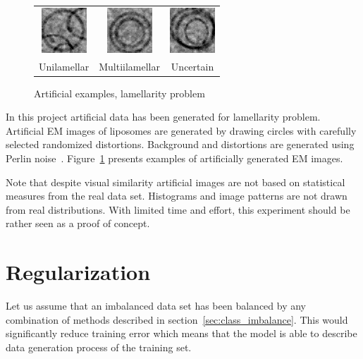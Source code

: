 \documentclass[a4paper, 11pt, table]{article}
\begin{document}
\begin{figure}[H]
\centering
\begin{tabular}{ccc}
	\includegraphics[scale=1.5]{synthetic/uni.png} & \includegraphics[scale=1.5]{synthetic/multi.png} & \includegraphics[scale=1.5]{synthetic/uncertain.png} \\
	Unilamellar & Multiilamellar & Uncertain \\[6pt]
\end{tabular}
\caption{Artificial examples, lamellarity problem}
\label{fig:synthetic_images}
\end{figure}

In this project artificial data has been generated for lamellarity problem. Artificial EM images of liposomes are generated by drawing circles with carefully selected randomized distortions. Background and distortions are generated using Perlin noise~\cite{Perlin:1985:IS:325165.325247}. Figure~\ref{fig:synthetic_images} presents examples of artificially generated EM images.

Note that despite visual similarity artificial images are not based on statistical measures from the real data set. Histograms and image patterns are not drawn from real distributions. With limited time and effort, this experiment should be rather seen as a proof of concept.


\section{Regularization}
\label{sec:regularization}

Let us assume that an imbalanced data set has been balanced by any combination of methods described in section~\ref{sec:class_imbalance}. This would significantly reduce training error which means that the model is able to describe data generation process of the training set. 
\end{document}
